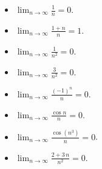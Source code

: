 \documentclass[12pt]{article}
\theoremstyle{definition}
\newcommand{\limn}{\displaystyle\lim_{n \to \infty}}
\begin{document}
\begin{multicols}{2}
\begin{itemize}
\item $\limn \displaystyle\frac{1}{n} = 0$.
\item $\limn \displaystyle\frac{1+n}{n} = 1$.
\item $\limn \displaystyle\frac{1}{n^2} = 0$.
\item $\limn \displaystyle\frac{3}{n^2} = 0$.
\item $\limn \displaystyle\frac{(-1)^n}{n} = 0$.
\item $\limn \displaystyle\frac{\cos n}{n} = 0$.
\item $\limn \displaystyle\frac{\cos \left(n^3\right)}{n} = 0$.
\item $\limn \displaystyle\frac{2 + 3 \, n}{n^2} = 0$.
\end{itemize}
\end{multicols}
\end{document}
